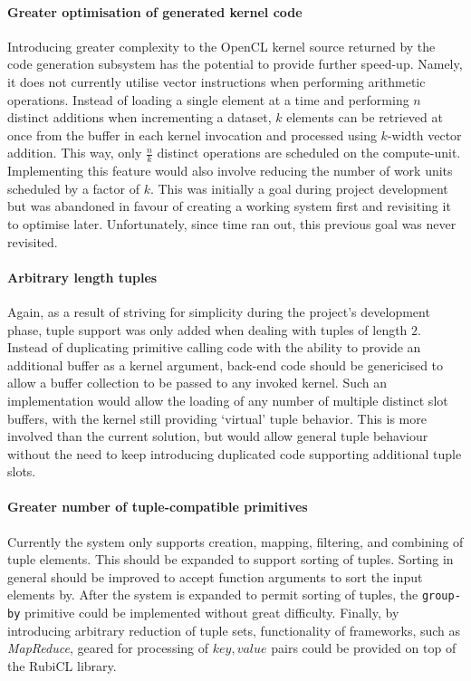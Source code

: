 \paragraph*{Greater optimisation of generated kernel code} Introducing greater complexity to the \ac{OpenCL} kernel source returned by the code generation subsystem has the potential to provide further speed-up. Namely, it does not currently utilise vector instructions when performing arithmetic operations. Instead of loading a single element at a time and performing $n$ distinct additions when incrementing a dataset, $k$ elements can be retrieved at once from the buffer in each kernel invocation and processed using $k$-width vector addition. This way, only $\frac{n}{k}$ distinct operations are scheduled on the compute-unit. Implementing this feature would also involve reducing the number of work units scheduled by a factor of $k$.
This was initially a goal during project development but was abandoned in favour of creating a working system first and revisiting it to optimise later. Unfortunately, since time ran out, this previous goal was never revisited.

\paragraph*{Arbitrary length tuples} Again, as a result of striving for simplicity during the project's development phase, tuple support was only added when dealing with tuples of length $2$. Instead of duplicating primitive calling code with the ability to provide an additional buffer as a kernel argument, back-end code should be genericised to allow a buffer collection to be passed to any invoked kernel.
Such an implementation would allow the loading of any number of multiple distinct slot buffers, with the kernel still providing `virtual' tuple behavior.
This is more involved than the current solution, but would allow general tuple behaviour without the need to keep introducing duplicated code supporting additional tuple slots.

\paragraph*{Greater number of tuple-compatible primitives} Currently the system only supports creation, mapping, filtering, and combining of tuple elements. This should be expanded to support sorting of tuples. Sorting in general should be improved to accept function arguments to sort the input elements by. After the system is expanded to permit sorting of tuples, the \verb|group-by| primitive could be implemented without great difficulty. Finally, by introducing arbitrary reduction of tuple sets, functionality of frameworks, such as \emph{MapReduce}, geared for processing of $key, value$ pairs could be provided on top of the RubiCL library.

